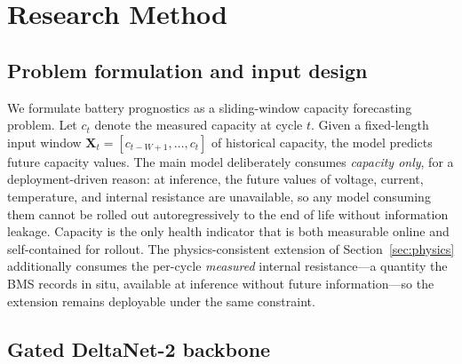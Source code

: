 \section{Research Method}
\label{sec:method}

\subsection{Problem formulation and input design}
\label{sec:formulation}

We formulate battery prognostics as a sliding-window capacity
forecasting problem. Let $c_t$ denote the measured capacity at cycle
$t$. Given a fixed-length input window
$\mathbf{X}_{t} = [c_{t-W+1}, \ldots, c_t]$ of historical capacity,
the model predicts future capacity values. The main model
deliberately consumes \emph{capacity only}, for a deployment-driven
reason: at inference, the future values of voltage, current,
temperature, and internal resistance are unavailable, so any model
consuming them cannot be rolled out autoregressively to the end of
life without information leakage. Capacity is the only health
indicator that is both measurable online and self-contained for
rollout. The physics-consistent extension of
Section~\ref{sec:physics} additionally consumes the per-cycle
\emph{measured} internal resistance---a quantity the BMS records in
situ, available at inference without future information---so the
extension remains deployable under the same constraint.

\subsection{Gated DeltaNet-2 backbone}
\label{sec:gdn2}

